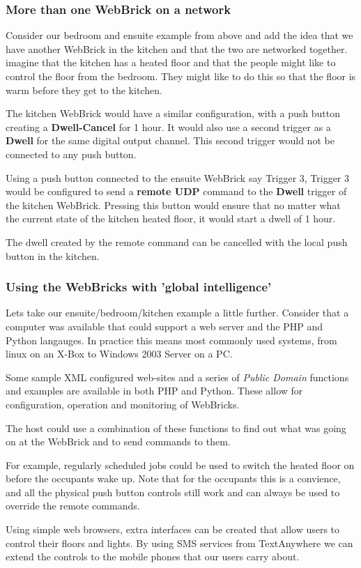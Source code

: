 \subsubsection{More than one WebBrick on a network}


Consider our bedroom and ensuite example from above and add the idea that we have another WebBrick in the kitchen and that the two are networked together.
imagine that the kitchen has a heated floor and that the people might like to control the floor from the bedroom.  They might like to do this so that the
floor is warm before they get to the kitchen.

The kitchen WebBrick would have a similar configuration, with a push button creating a \textbf{Dwell-Cancel} for 1 hour.  It would also use a second trigger
as a \textbf{Dwell} for the same digital output channel.  This second trigger would not be connected to any push button.

Using a push button connected to the ensuite WebBrick say Trigger 3, Trigger 3 would be configured to send a \textbf{remote UDP} command to the \textbf{Dwell}
trigger of the kitchen WebBrick.  Pressing this button would ensure that no matter what the current state of the kitchen heated floor, it would start a dwell of 1 hour.

The dwell created by the remote command can be cancelled with the local push button in the kitchen.

\subsubsection{Using the WebBricks with 'global intelligence'}

Lets take our ensuite/bedroom/kitchen example a little further.  Consider that a computer was available that could support a web server
and the PHP and Python langauges. In practice this means most commonly used systems, from linux on an X-Box to Windows 2003 Server on a PC.

Some sample XML configured web-sites and a series of {\em Public Domain} functions and examples are available in both PHP and Python.  These allow for configuration, operation and monitoring of WebBricks.

The host could use a combination of these functions to find out what was going on at the WebBrick and to send commands to them.

For example, regularly scheduled jobs could be used to switch the heated floor on before the occupants wake up.  Note that for the occupants
this is a convience, and all the physical push button controls still work and can always be used to override the remote commands.

Using simple web browsers, extra interfaces can be created that allow users to control their floors and lights.  By using SMS services from TextAnywhere we can extend the controls to the mobile phones that our users carry about.



